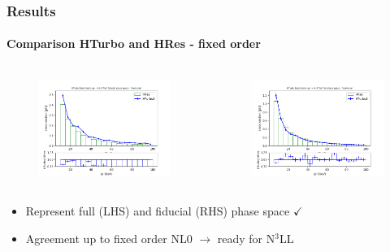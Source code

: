 \documentclass[aspectratio=43]{beamer}
\begin{document}
\begin{frame}

\frametitle{Results}
\framesubtitle{Comparison HTurbo and HRes - fixed order}

	\begin{columns}
	
		
		\begin{figure}
			\includegraphics[width = 7cm]{plots/part_III/hturbo_figure_6b_FO.png}
		\end{figure}
		
		
		\begin{figure}
			\includegraphics[width = 7cm]{plots/part_III/hturbo_figure_7b_FO.png}
		\end{figure}
		
	\end{columns}
	
	\begin{itemize}
		\item Represent full (LHS) and fiducial (RHS) phase space {\color{darkgreen}$\checkmark$} 
		\item Agreement up to fixed order NL0 $\longrightarrow$ {\color{blue}ready for N$^{3}$LL}
	\end{itemize}

\end{frame}
\end{document}
